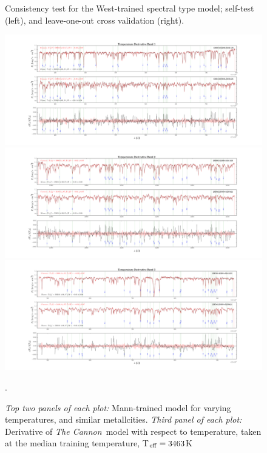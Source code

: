 \documentclass[modern]{aastex62}
\newcommand{\thecannon}{\textsl{The Cannon}}
\begin{document}
\begin{figure}[ht]
\begin{center}
\end{center}
\caption{Consistency test for the West-trained spectral type model; self-test (left), and leave-one-out cross validation (right).} \label{fig:west_validation}
\end{figure}

\begin{figure}[ht]
\begin{center}
\includegraphics[width=16cm]{figures/demo_derivatives_teff1.png}
\includegraphics[width=16cm]{figures/demo_derivatives_teff2.png}
\includegraphics[width=16cm]{figures/demo_derivatives_teff3.png}
\end{center}
\caption{\textit{Top two panels of each plot:} Mann-trained model for varying temperatures, and similar metallcities. \textit{Third panel of each plot:} Derivative of \thecannon\ model with respect to temperature, taken at the median training temperature, T$_{\rm eff}=3463$K}. \label{fig:demo_teff}
\end{figure}
\end{document}
